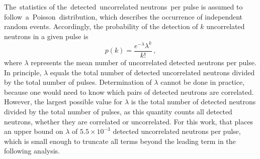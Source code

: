 The statistics of the detected uncorrelated neutrons per pulse is assumed to follow a Poisson distribution, which describes the occurrence of independent random events.
Accordingly, the probability of the detection of $k$ uncorrelated neutrons in a given pulse is
\begin{equation} \label{math:Pois}
p(k) = \frac{e^{-\lambda}\lambda^{k}}{k!} \, ,
\end{equation}
where $\lambda$ represents the mean number of uncorrelated detected neutrons per pulse.
In principle, $\lambda$ equals the total number of detected uncorrelated neutrons divided by the total number of pulses.
Determination of $\lambda$ cannot be done in practice, because one would need to know which pairs of detected neutrons are correlated.
However, the largest possible value for $\lambda$ is the total number of detected neutrons divided by the total number of pulses, as this quantity counts all detected neutrons, whether they are correlated or uncorrelated.
For this work, that places an upper bound on $\lambda$ of $5.5\times 10^{-3}$ detected uncorrelated neutrons per pulse, which is small enough to truncate all terms beyond the leading term in the following analysis.


